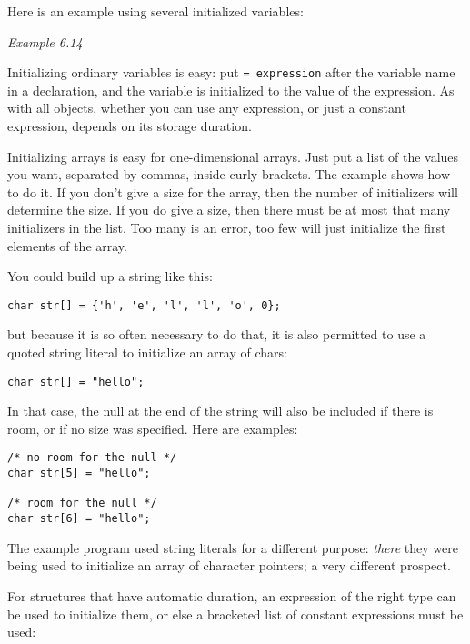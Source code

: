    Here is an example using several initialized variables:


   \begin{center}\textit{Example 6.14}\end{center}


   Initializing ordinary variables is easy: put \texttt{= expression}
    after the variable name in a declaration, and the variable is initialized
    to the value of the expression. As with all objects, whether you can use
    any expression, or just a constant expression, depends on its storage
    duration.


   Initializing arrays is easy for one-dimensional arrays. Just put a list
    of the values you want, separated by commas, inside curly brackets. The
    example shows how to do it. If you don't give a size for the array, then
    the number of initializers will determine the size. If you do give a size,
    then there must be at most that many initializers in the list. Too many is
    an error, too few will just initialize the first elements of the array.


   You could build up a string like this:


   \begin{Verbatim}
char str[] = {'h', 'e', 'l', 'l', 'o', 0};
\end{Verbatim}

   but because it is so often necessary to do that, it is also permitted to
    use a quoted string literal to initialize an array of chars:


   \begin{Verbatim}
char str[] = "hello";
\end{Verbatim}

   In that case, the null at the end of the string will also be included if
    there is room, or if no size was specified. Here are examples:


   \begin{Verbatim}
/* no room for the null */
char str[5] = "hello";

/* room for the null */
char str[6] = "hello";
\end{Verbatim}

   The example program used string literals for a different purpose:
    \textit{there} they were being used to initialize an array of character
    pointers; a very different prospect.


   For structures that have automatic duration, an expression of the right
    type can be used to initialize them, or else a bracketed list of constant
    expressions must be used:


